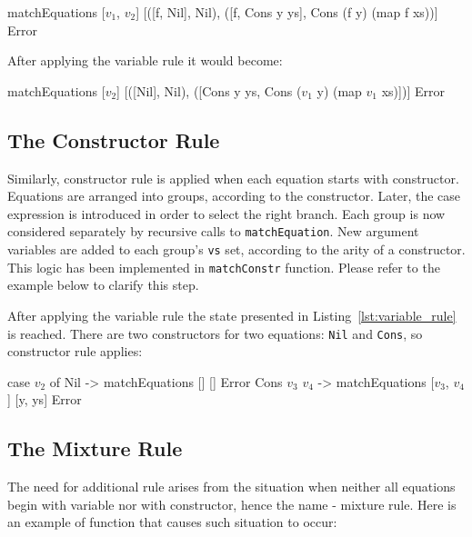 \documentclass[12pt,a4paper]{report}
\begin{document}
\vspace*{0.2in}
\begin{code}[style=haskell,mathescape=true]
matchEquations [$v_{1}$, $v_{2}$]
               [([f, Nil], Nil),
                ([f, Cons y ys], Cons (f y) (map f xs))]
               Error
\end{code}

After applying the variable rule it would become:

\vspace*{0.2in}
\begin{code}[style=haskell,label=lst:variable_rule, caption={State after applying
  variable rule.}, mathescape=true]
matchEquations [$v_{2}$]
               [([Nil], Nil),
                ([Cons y ys, Cons ($v_{1}$ y) (map $v_{1}$ xs)])]
               Error
\end{code}

\subsection{The Constructor Rule}
\label{sec:constructor_rule}
Similarly, constructor rule is applied when each equation starts with
constructor. Equations are arranged into groups, according to the constructor.
Later, the case expression is introduced in order to select the right branch.
Each group is now considered separately by recursive calls to
\texttt{matchEquation}. New argument variables are added to each group's
\texttt{vs} set, according to the arity of a constructor. This logic has
been implemented in \texttt{matchConstr} function. Please refer to the example
below to clarify this step.

After applying the variable rule the state presented in
Listing~\ref{lst:variable_rule} is reached. There are two constructors for two
equations: \texttt{Nil} and \texttt{Cons}, so constructor rule applies:

\vspace*{0.2in}
\begin{code}[style=haskell,label=lst:constructor_rule, caption={State after applying
  constructor rule.}, mathescape=true]
case $v_{2}$ of
    Nil       -> matchEquations []
                                []
                                Error
    Cons $v_{3}$ $v_{4}$ -> matchEquations [$v_{3}$, $v_{4}$]
                                [y, ys]
                                Error
\end{code}

\subsection{The Mixture Rule}
The need for additional rule arises from the situation when neither all
equations begin with variable nor with constructor, hence the name - mixture
rule. Here is an example of function that causes such situation to occur:
\end{document}
